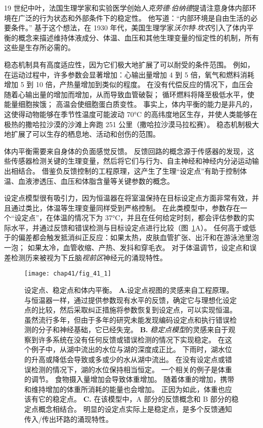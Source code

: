 19 世纪中叶，法国生理学家和实验医学创始人\textit{克劳德$\cdot$伯纳德}提请注意身体内部环境在广泛的行为状态和外部条件下的稳定性。
他写道：“内部环境是自由生活的必要条件。” 
基于这个想法，在 1930 年代，美国生理学家\textit{沃尔特$\cdot$坎农}引入了体内平衡的概念来描述维持体液成分、体温、血压和其他生理变量的恒定性的机制，所有这些是生存所必需的。


稳态机制具有高度适应性，因为它们极大地扩展了可以耐受的条件范围。
例如，在运动过程中，许多参数会显著增加：心输出量增加 4 到 5 倍，氧气和燃料消耗增加 5 到 10 倍，产热量增加到类似的程度。
在没有代偿反应的情况下，血压会随着心输出量的增加而增加，从而导致血管破裂；
循环燃料将降至极低水平，使能量细胞挨饿；
高温会使细胞蛋白质变性。
事实上，体内平衡的能力是非凡的，这使得动物能够在季节性温度可能波动 70°C 的高纬度地区生存，并使人类能够在极热的撒哈拉沙漠的沙滩上奔跑 251 公里（撒哈拉沙漠马拉松赛）。
稳态机制极大地扩展了可以生存的栖息地、活动和创伤的范围。


体内平衡需要来自身体的负面感觉反馈。
反馈回路的概念源于传感器的发现，这些传感器检测关键的生理变量，然后将它们与行为、自主神经和神经内分泌运动输出相结合。
借鉴负反馈控制的工程原理，这产生了生理“设定点”有助于控制体温、血液渗透压、血压和体脂含量等关键参数的概念。


设定点模型很有吸引力，因为恒温器在将室温保持在目标设定点方面非常有效，并且通过类比，体温等生理变量同样受到严格控制。
在此类模型中，参数存在一个“设定点”，在体温的情况下为 37°C，并且在任何给定时刻，都会评估参数的实际水平，并通过反馈和错误检测与目标设定点进行比较（图~\ref{fig:41_1}A）。
任何高于或低于的偏差都会触发抵消纠正反应：如果太热，皮肤血管扩张、出汗和在游泳池里泡一泡；
如果太冷，血管收缩、产热、发抖和穿毛衣。
对于体温调节，设定点和误差检测历来被视为下丘脑\textit{视前区}神经元的涌现特性。


\begin{figure}[htbp]
	\centering
	\texttt{[image: chap41/fig\_41\_1]}
	\caption{设定点、稳定点和体内平衡。
		\textbf{A.}设定点视图的灵感来自工程原理。
		与恒温器一样，通过提供参数现有水平的反馈，确定它与理想化设定点的比较，然后采取纠正措施将参数恢复到设定点，可以实现恒温。
		虽然流行多年，但由于多年的研究未能发现编码设定点和执行错误检测的分子和神经基础，它已经失宠。
		\textbf{B.} \textit{稳定点模型}的灵感来自于观察到许多系统在没有任何反馈或错误检测的情况下实现稳定。
		在这个例子中，从湖中流出的水位与湖的深度成正比。
		下雨时，湖水位的升高或降低会导致或多或少的水从湖中流出。
		在没有设定点或错误检测的情况下，湖的水位保持相当恒定。
		一个相关的例子是体重的调节。
		食物摄入量增加会导致体重增加。 随着体重的增加，携带和维持增加的体重所消耗的能量也会增加。
		正因为如此，体重也应该有它的稳定点\cite{speakman2011set}。
		\textbf{C.} 在该模型中，A 部分的反馈概念和 B 部分的稳定点概念相结合。
		明显的设定点实际上是稳定点，是多个反馈通知传入/传出环路的涌现特性。}
	\label{fig:41_1}
\end{figure}


